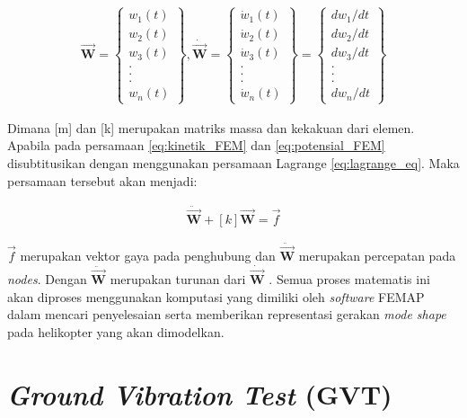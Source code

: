 \begin{align*}
\overrightarrow{\textbf{W}}=\left\{ \begin{matrix} w_1(t) \\ w_2(t) \\ w_3(t) \\ .\\ .\\ .\\ w_n(t) \end{matrix}\right\}, \dot{\overrightarrow{\textbf{W}}}=\left\{ \begin{matrix} \dot{w}_1(t) \\ \dot{w}_2(t) \\ \dot{w}_3(t) \\ .\\ .\\ .\\ \dot{w}_n(t) \end{matrix}\right\}=\left\{ \begin{matrix} dw_1/dt \\ dw_2/dt \\ dw_3/dt \\ .\\ .\\ .\\ dw_n/dt \end{matrix}\right\}
\end{align*}

Dimana [m] dan [k] merupakan matriks massa dan kekakuan dari elemen. Apabila pada persamaan \ref{eq:kinetik_FEM} dan \ref{eq:potensial_FEM} disubtitusikan dengan menggunakan persamaan Lagrange \ref{eq:lagrange_eq}. Maka persamaan tersebut akan menjadi:

\begin{align}
	[m]\ddot{\overrightarrow{\textbf{W}}}+[k]\overrightarrow{\textbf{W}}=\overrightarrow{f}
	\label{eq:kinetik+potensial_lagrange}
\end{align}

$\overrightarrow{f}$ merupakan vektor gaya pada penghubung dan $\ddot{\overrightarrow{\textbf{W}}}$ merupakan percepatan pada \textit{nodes}. Dengan $\ddot{\overrightarrow{\textbf{W}}}$ merupakan turunan dari $\dot{\overrightarrow{\textbf{W}}}$ \cite{rao2004mechanical}. Semua proses matematis ini akan diproses menggunakan komputasi yang dimiliki oleh \textit{software} FEMAP dalam mencari penyelesaian serta memberikan representasi gerakan \textit{mode shape} pada helikopter yang akan dimodelkan.

\section{\textit{Ground Vibration Test} (GVT)}
\label{sec:GVT}


